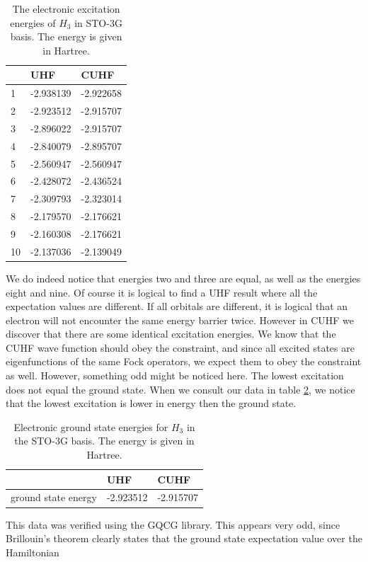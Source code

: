 \documentclass[twoside,twocolumn,9pt]{article}
\begin{document}
\begin{table}[h]
  \caption{The electronic excitation energies of $H_3$ in STO-3G basis. The energy is given in Hartree.}
  \label{tab:excits}
  \begin{tabular}{l|l|l}
       & UHF       & CUHF      \\
    \hline
    1  & -2.938139 & -2.922658 \\
    2  & -2.923512 & -2.915707 \\
    3  & -2.896022 & -2.915707 \\
    4  & -2.840079 & -2.895707 \\
    5  & -2.560947 & -2.560947 \\
    6  & -2.428072 & -2.436524 \\
    7  & -2.309793 & -2.323014 \\
    8  & -2.179570 & -2.176621 \\
    9  & -2.160308 & -2.176621 \\
    10 & -2.137036 & -2.139049
  \end{tabular}
\end{table}
We do indeed notice that energies two and three are equal, as well as the energies eight and nine. Of course it is logical to find a UHF result where all the expectation values are
different. If all orbitals are different, it is logical that an electron will not encounter the same energy barrier twice. However in CUHF we discover that there are some identical
excitation energies. We know that the CUHF wave function should obey the constraint, and since all excited states are eigenfunctions of the same Fock operators, we expect them to
obey the constraint as well. However, something odd might be noticed here. The lowest excitation does not equal the ground state. When we consult our data in table
\ref{tab:ground states}, we notice that the lowest excitation is lower in energy then the ground state.
\begin{table}[h]
  \caption{Electronic ground state energies for $H_3$ in the STO-3G basis. The energy is given in Hartree.}
  \label{tab:ground states}
  \begin{tabular}{l|l|l}
                        & UHF       & CUHF      \\
    \hline
    ground state energy & -2.923512 & -2.915707
  \end{tabular}
\end{table}
This data was verified using the GQCG library. This appears very odd, since Brillouin's theorem clearly states that the ground state expectation value over the Hamiltonian
\end{document}
